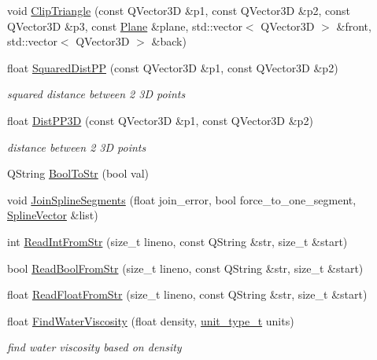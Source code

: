 \begin{DoxyCompactItemize}
\item 
void \hyperlink{namespaceShipCAD_a41e6294f71b66bca070c744accbb3ef2}{Clip\-Triangle} (const Q\-Vector3\-D \&p1, const Q\-Vector3\-D \&p2, const Q\-Vector3\-D \&p3, const \hyperlink{classShipCAD_1_1Plane}{Plane} \&plane, std\-::vector$<$ Q\-Vector3\-D $>$ \&front, std\-::vector$<$ Q\-Vector3\-D $>$ \&back)
\item 
float \hyperlink{namespaceShipCAD_a6f9f5ac15e7e2821bba27ba06827a4e1}{Squared\-Dist\-P\-P} (const Q\-Vector3\-D \&p1, const Q\-Vector3\-D \&p2)
\begin{DoxyCompactList}\small\item\em squared distance between 2 3\-D points \end{DoxyCompactList}\item 
float \hyperlink{namespaceShipCAD_a438e97b711c6878eba3bf7182e68a3c7}{Dist\-P\-P3\-D} (const Q\-Vector3\-D \&p1, const Q\-Vector3\-D \&p2)
\begin{DoxyCompactList}\small\item\em distance between 2 3\-D points \end{DoxyCompactList}\item 
Q\-String \hyperlink{namespaceShipCAD_a45ba7de6922e89cbddf2a4c9c810a2e4}{Bool\-To\-Str} (bool val)
\item 
void \hyperlink{namespaceShipCAD_a2eddf75f0e29363ab81a3fb0e0211848}{Join\-Spline\-Segments} (float join\-\_\-error, bool force\-\_\-to\-\_\-one\-\_\-segment, \hyperlink{namespaceShipCAD_a053b941b2c87049bb9380428d4d5a056}{Spline\-Vector} \&list)
\item 
int \hyperlink{namespaceShipCAD_a70b238d926183460670b82d9680b5cb9}{Read\-Int\-From\-Str} (size\-\_\-t lineno, const Q\-String \&str, size\-\_\-t \&start)
\item 
bool \hyperlink{namespaceShipCAD_af343b5a2dfd09b32b9451d35e0676384}{Read\-Bool\-From\-Str} (size\-\_\-t lineno, const Q\-String \&str, size\-\_\-t \&start)
\item 
float \hyperlink{namespaceShipCAD_a696bc38864a736dda734802f3cda4346}{Read\-Float\-From\-Str} (size\-\_\-t lineno, const Q\-String \&str, size\-\_\-t \&start)
\item 
float \hyperlink{namespaceShipCAD_a44025ef38e6ee9f12cbf032660f637b5}{Find\-Water\-Viscosity} (float density, \hyperlink{namespaceShipCAD_ac6a7a28b4b063771afae92decb602da5}{unit\-\_\-type\-\_\-t} units)
\begin{DoxyCompactList}\small\item\em find water viscosity based on density \end{DoxyCompactList}\item 

\end{DoxyCompactItemize}
